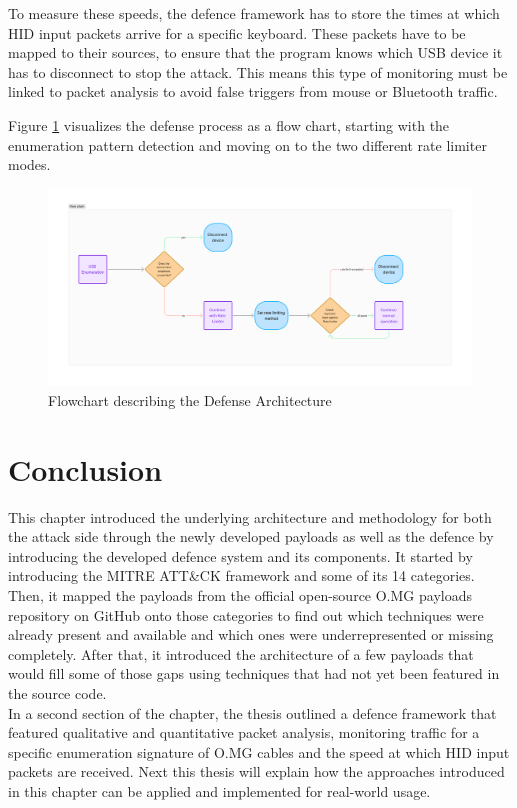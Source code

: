 To measure these speeds, the defence framework has to store the times at which HID input packets arrive for a specific keyboard. These packets have to be mapped to their sources, to ensure that the program knows which USB device it has to disconnect to stop the attack. This means this type of monitoring must be linked to packet analysis to avoid false triggers from mouse or Bluetooth traffic.

Figure \ref{fig:defense_flowchart} visualizes the defense process as a flow chart, starting with the enumeration pattern detection and moving on to the two different rate limiter modes. 

\begin{figure}[H]
    \centering
    \includegraphics[width=0.75\linewidth]{visuals/defense_flowchart.png}
    \caption{Flowchart describing the Defense Architecture}
    \label{fig:defense_flowchart}
\end{figure}


\section{Conclusion}

This chapter introduced the underlying architecture and methodology for both the attack side through the newly developed payloads as well as the defence by introducing the developed defence system and its components. 
It started by introducing the MITRE ATT\&CK framework and some of its 14 categories. Then, it mapped the payloads from the official open-source O.MG payloads repository on GitHub onto those categories to find out which techniques were already present and available and which ones were underrepresented or missing completely. After that, it introduced the architecture of a few payloads that would fill some of those gaps using techniques that had not yet been featured in the source code. \\
In a second section of the chapter, the thesis outlined a defence framework that featured qualitative and quantitative packet analysis, monitoring traffic for a specific enumeration signature of O.MG cables and the speed at which HID input packets are received. Next this thesis will explain how the approaches introduced in this chapter can be applied and implemented for real-world usage. 



